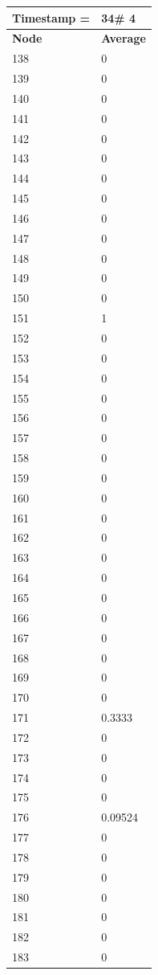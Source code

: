 \begin{tabular}{|l||l|}
\hline
\textbf{Timestamp =} & \textbf{34}\# 4\\\hline
	\textbf{Node} & \textbf{Average} \\ \hline
\hline
	138 & 0 \\ \hline
	139 & 0 \\ \hline
	140 & 0 \\ \hline
	141 & 0 \\ \hline
	142 & 0 \\ \hline
	143 & 0 \\ \hline
	144 & 0 \\ \hline
	145 & 0 \\ \hline
	146 & 0 \\ \hline
	147 & 0 \\ \hline
	148 & 0 \\ \hline
	149 & 0 \\ \hline
	150 & 0 \\ \hline
	151 & 1 \\ \hline
	152 & 0 \\ \hline
	153 & 0 \\ \hline
	154 & 0 \\ \hline
	155 & 0 \\ \hline
	156 & 0 \\ \hline
	157 & 0 \\ \hline
	158 & 0 \\ \hline
	159 & 0 \\ \hline
	160 & 0 \\ \hline
	161 & 0 \\ \hline
	162 & 0 \\ \hline
	163 & 0 \\ \hline
	164 & 0 \\ \hline
	165 & 0 \\ \hline
	166 & 0 \\ \hline
	167 & 0 \\ \hline
	168 & 0 \\ \hline
	169 & 0 \\ \hline
	170 & 0 \\ \hline
	171 & 0.3333 \\ \hline
	172 & 0 \\ \hline
	173 & 0 \\ \hline
	174 & 0 \\ \hline
	175 & 0 \\ \hline
	176 & 0.09524 \\ \hline
	177 & 0 \\ \hline
	178 & 0 \\ \hline
	179 & 0 \\ \hline
	180 & 0 \\ \hline
	181 & 0 \\ \hline
	182 & 0 \\ \hline
	183 & 0 \\ \hline
\end{tabular}
